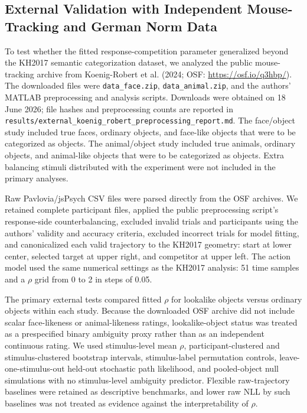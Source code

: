 
\subsection{External Validation with Independent Mouse-Tracking and German Norm Data}

To test whether the fitted response-competition parameter generalized beyond the KH2017 semantic categorization dataset, we analyzed the public mouse-tracking archive from Koenig-Robert et al. (2024; OSF: \url{https://osf.io/q3hbp/}). The downloaded files were \texttt{data\_face.zip}, \texttt{data\_animal.zip}, and the authors' MATLAB preprocessing and analysis scripts. Downloads were obtained on 18 June 2026; file hashes and preprocessing counts are reported in \texttt{results/external\_koenig\_robert\_preprocessing\_report.md}. The face/object study included true faces, ordinary objects, and face-like objects that were to be categorized as objects. The animal/object study included true animals, ordinary objects, and animal-like objects that were to be categorized as objects. Extra balancing stimuli distributed with the experiment were not included in the primary analyses.

Raw Pavlovia/jsPsych CSV files were parsed directly from the OSF archives. We retained complete participant files, applied the public preprocessing script's response-side counterbalancing, excluded invalid trials and participants using the authors' validity and accuracy criteria, excluded incorrect trials for model fitting, and canonicalized each valid trajectory to the KH2017 geometry: start at lower center, selected target at upper right, and competitor at upper left. The action model used the same numerical settings as the KH2017 analysis: 51 time samples and a $\rho$ grid from 0 to 2 in steps of 0.05.

The primary external tests compared fitted $\rho$ for lookalike objects versus ordinary objects within each study. Because the downloaded OSF archive did not include scalar face-likeness or animal-likeness ratings, lookalike-object status was treated as a prespecified binary ambiguity proxy rather than as an independent continuous rating. We used stimulus-level mean $\rho$, participant-clustered and stimulus-clustered bootstrap intervals, stimulus-label permutation controls, leave-one-stimulus-out held-out stochastic path likelihood, and pooled-object null simulations with no stimulus-level ambiguity predictor. Flexible raw-trajectory baselines were retained as descriptive benchmarks, and lower raw NLL by such baselines was not treated as evidence against the interpretability of $\rho$.

